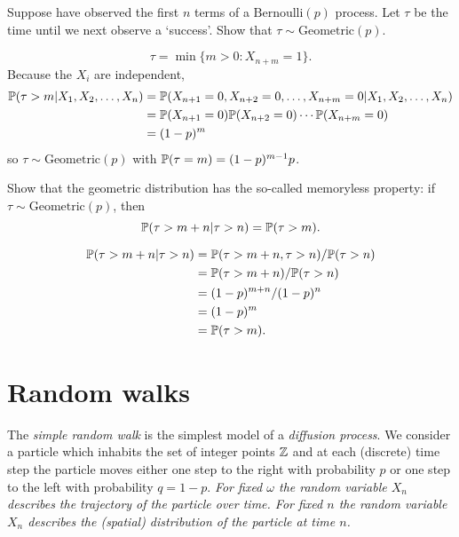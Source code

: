 \begin{example} 
Suppose have observed the first $n$ terms of a $\text{Bernoulli}(p)$ process. Let $\tau$ be the time until we next observe a `success'. Show that $\tau\sim\text{Geometric}(p)$.
\begin{solution}
\[
\tau = \min\{m>0:X_{n+m}=1\}. 
\]
Because the $X_i$ are independent,
\begin{align*}
\mathbb{P}(\tau > m | X_1,X_2,\ldots,X_n)
	& = \mathbb{P}(X_{n+1}=0,X_{n+2}=0,\ldots,X_{n+m}=0 | X_1,X_2,\ldots,X_n) \\
	& = \mathbb{P}(X_{n+1}=0)\mathbb{P}(X_{n+2}=0)\cdots\mathbb{P}(X_{n+m}=0) \\
	& = (1-p)^{m}
\end{align*}
so $\tau\sim\text{Geometric}(p)$ with $\mathbb{P}(\tau=m)=(1-p)^{m-1}p$.
\end{solution}
\end{example}

\begin{exercise}
Show that the geometric distribution has the so-called memoryless property: if $\tau\sim\text{Geometric}(p)$, then
\[
\mathbb{P}(\tau > m+n|\tau > n) = \mathbb{P}(\tau > m).
\]
\begin{answer}
\begin{align*}
\mathbb{P}(\tau > m+n|\tau > n) 
	& = \mathbb{P}(\tau>m+n,\tau>n)/\mathbb{P}(\tau>n) \\
	& = \mathbb{P}(\tau>m+n)/\mathbb{P}(\tau>n) \\
	& = (1-p)^{m+n}/(1-p)^n \\
	& = (1-p)^m \\
	& = \mathbb{P}(\tau > m).
\end{align*}
\end{answer}
\end{exercise}



\section{Random walks}\label{sec:rwalks}

The \emph{simple random walk} is the simplest model of a \emph{diffusion process}. We consider a particle which inhabits the set of integer points $\mathbb{Z}$ and at each (discrete) time step the particle moves either one step to the right with probability $p$ or one step to the left with probability $q=1-p$. 
\bit
\it For fixed $\omega$ the random variable $X_n$ describes the trajectory of the particle over time.
\it For fixed $n$ the random variable $X_n$ describes the (spatial) distribution of the particle at time $n$.
\eit

